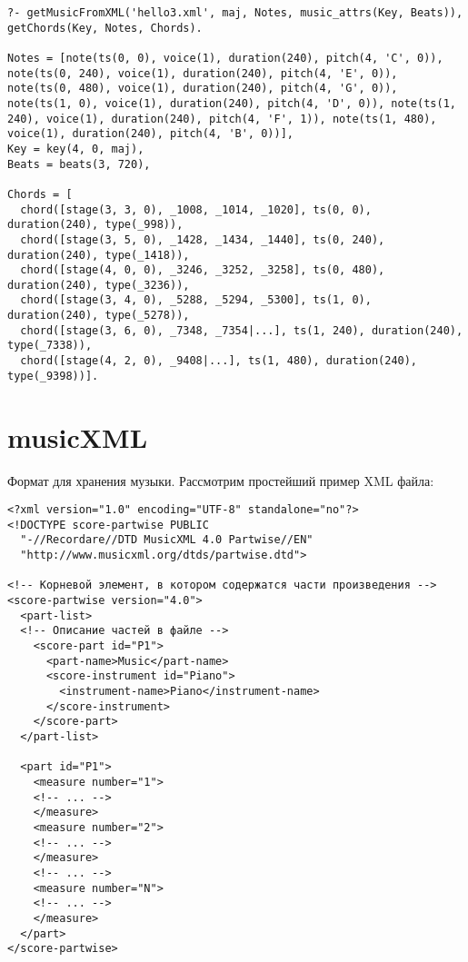\documentclass[12pt]{article}
\begin{document}
\begin{verbatim}
?- getMusicFromXML('hello3.xml', maj, Notes, music_attrs(Key, Beats)), getChords(Key, Notes, Chords).

Notes = [note(ts(0, 0), voice(1), duration(240), pitch(4, 'C', 0)), note(ts(0, 240), voice(1), duration(240), pitch(4, 'E', 0)), note(ts(0, 480), voice(1), duration(240), pitch(4, 'G', 0)), note(ts(1, 0), voice(1), duration(240), pitch(4, 'D', 0)), note(ts(1, 240), voice(1), duration(240), pitch(4, 'F', 1)), note(ts(1, 480), voice(1), duration(240), pitch(4, 'B', 0))],
Key = key(4, 0, maj),
Beats = beats(3, 720),

Chords = [
  chord([stage(3, 3, 0), _1008, _1014, _1020], ts(0, 0), duration(240), type(_998)),
  chord([stage(3, 5, 0), _1428, _1434, _1440], ts(0, 240), duration(240), type(_1418)),
  chord([stage(4, 0, 0), _3246, _3252, _3258], ts(0, 480), duration(240), type(_3236)),
  chord([stage(3, 4, 0), _5288, _5294, _5300], ts(1, 0), duration(240), type(_5278)),
  chord([stage(3, 6, 0), _7348, _7354|...], ts(1, 240), duration(240), type(_7338)),
  chord([stage(4, 2, 0), _9408|...], ts(1, 480), duration(240), type(_9398))].
\end{verbatim}

\section{musicXML}

Формат для хранения музыки. Рассмотрим простейший пример XML файла:

\begin{verbatim}
<?xml version="1.0" encoding="UTF-8" standalone="no"?>
<!DOCTYPE score-partwise PUBLIC
  "-//Recordare//DTD MusicXML 4.0 Partwise//EN"
  "http://www.musicxml.org/dtds/partwise.dtd">

<!-- Корневой элемент, в котором содержатся части произведения -->
<score-partwise version="4.0">
  <part-list>
  <!-- Описание частей в файле -->
    <score-part id="P1">
      <part-name>Music</part-name>
      <score-instrument id="Piano">
        <instrument-name>Piano</instrument-name>
      </score-instrument>
    </score-part>
  </part-list>

  <part id="P1">
    <measure number="1">
    <!-- ... -->
    </measure>
    <measure number="2">
    <!-- ... -->
    </measure>
    <!-- ... -->
    <measure number="N">
    <!-- ... -->
    </measure>
  </part>
</score-partwise>
\end{verbatim}
\end{document}
